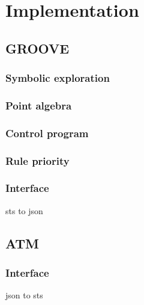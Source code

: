 \section{Implementation}\label{sec:implementation}

\subsection{GROOVE}

\subsubsection{Symbolic exploration}

\subsubsection{Point algebra}

\subsubsection{Control program}

\subsubsection{Rule priority}

\subsubsection{Interface}
sts to json

\subsection{ATM}

\subsubsection{Interface}
json to sts

